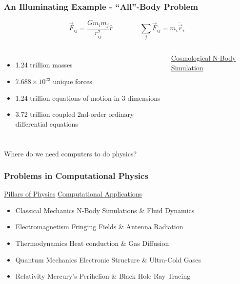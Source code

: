 \documentclass{beamer}
\begin{document}
\begin{frame}
    \frametitle{An Illuminating Example - ``All''-Body Problem}
    \vspace{-0.75in}
    \begin{equation}
        \vec{F}_{ij} = \frac{G m_i m_j}{r_{ij}^2} \hat{r} \qquad \qquad \sum_j \vec{F}_{ij} = m_i \ddot{\vec{r}}_i 
    \end{equation}

    \begin{columns}
        \begin{itemize}
            \item 1.24 trillion masses
            \item $7.688\times 10^{23}$ unique forces
            \item 1.24 trillion equations of motion in 3 dimensions
            \item 3.72 trillion coupled 2nd-order ordinary differential equations
        \end{itemize}

        \href{https://youtu.be/JAyrpJCC_dw?si=eY7EbSKib7siokgG}{Cosmological N-Body Simulation}\cite{Heitmann_2021}
    \end{columns}
\end{frame}

\begin{frame}

    \begin{block}{}
        \centering \Large Where do we need computers to do physics?
    \end{block}

\end{frame}

\begin{frame}
\frametitle{Problems in Computational Physics}
    \hspace{0.25in} \underline{Pillars of Physics} \hfill \underline{Computational Applications}
    \begin{itemize}
        \item <1-> Classical Mechanics \phantom{  } \rightarrowfill \phantom{  } N-Body Simulations \& Fluid Dynamics
        \item <2-> Electromagnetism \phantom{  } \rightarrowfill \phantom{  } Fringing Fields \& Antenna Radiation
        \item <3-> Thermodynamics \phantom{  } \rightarrowfill \phantom{  } Heat conduction \& Gas Diffusion
        \item <4-> Quantum Mechanics \phantom{  } \rightarrowfill \phantom{  } Electronic Structure \& Ultra-Cold Gases
        \item <5-> Relativity \phantom{  } \rightarrowfill \phantom{  } Mercury's Perihelion \& Black Hole Ray Tracing
    \end{itemize}
\end{frame}
\end{document}
